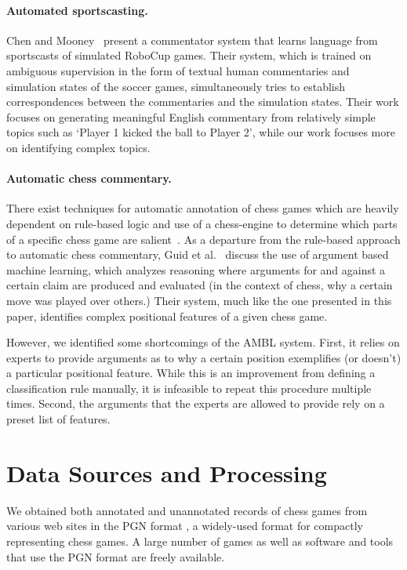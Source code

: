 \documentclass[11pt]{article}
\begin{document}
\paragraph{Automated sportscasting.} Chen and Mooney~ present a commentator system that learns language from sportscasts of simulated RoboCup games. Their system, which is trained on ambiguous supervision in the form of textual human commentaries and simulation states of the soccer games, simultaneously tries to establish correspondences between the commentaries and the simulation states. Their work focuses on generating meaningful English commentary from relatively simple topics such as ‘Player 1 kicked the ball to Player 2’, while our work focuses more on identifying complex topics.

\paragraph{Automatic chess commentary.} There exist techniques for automatic annotation of chess games which are heavily dependent on rule-based logic and use of a chess-engine to determine which parts of a specific chess game are salient~\cite{cambridge-chess-annotation}. As a departure from the rule-based approach to automatic chess commentary, Guid et al.~ discuss the use of argument based machine learning, which analyzes reasoning where arguments for and against a certain claim are produced and evaluated (in the context of chess, why a certain move was played over others.) Their system, much like the one presented in this paper, identifies complex positional features of a given chess game.

However, we identified some shortcomings of the AMBL system. First, it relies on experts to provide arguments as to why a certain position exemplifies (or doesn’t) a particular positional feature. While this is an improvement from defining a classification rule manually, it is infeasible to repeat this procedure multiple times. Second, the arguments that the experts are allowed to provide rely on a preset list of features.

\section{Data Sources and Processing}
We obtained both annotated and unannotated records of chess games from various web sites in the PGN format \cite{pgn}, a widely-used format for compactly representing chess games. A large number of games as well as software and tools that use the PGN format are freely available. 
\end{document}
